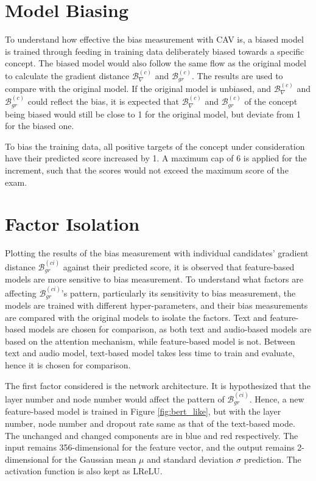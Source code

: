 \section{Model Biasing}
To understand how effective the bias measurement with CAV is, a biased model is trained through feeding in training data deliberately biased towards a specific concept. The biased model would also follow the same flow as the original model to calculate the gradient distance $\mathcal{B}^{(c)}_{\nabla}$ and $\mathcal{B}^{(c)}_{gr}$. The results are used to compare with the original model. If the original model is unbiased, and $\mathcal{B}^{(c)}_{\nabla}$ and $\mathcal{B}^{(c)}_{gr}$ could reflect the bias, it is expected that $\mathcal{B}^{(c)}_{\nabla}$ and $\mathcal{B}^{(c)}_{gr}$ of the concept being biased would still be close to 1 for the original model, but deviate from 1 for the biased one.

To bias the training data, all positive targets of the concept under consideration have their predicted score increased by 1. A maximum cap of 6 is applied for the increment, such that the scores would not exceed the maximum score of the exam.

\section{Factor Isolation}
Plotting the results of the bias measurement with individual candidates' gradient distance $\mathcal{B}^{(ci)}_{gr}$ against their predicted score, it is observed that feature-based models are more sensitive to bias measurement. To understand what factors are affecting $\mathcal{B}^{(ci)}_{gr}$'s pattern, particularly its sensitivity to bias measurement, the models are trained with different hyper-parameters, and their bias measurements are compared with the original models to isolate the factors. Text and feature-based models are chosen for comparison, as both text and audio-based models are based on the attention mechanism, while feature-based model is not. Between text and audio model, text-based model takes less time to train and evaluate, hence it is chosen for comparison.

The first factor considered is the network architecture. It is hypothesized that the layer number and node number would affect the pattern of $\mathcal{B}^{(ci)}_{gr}$. Hence, a new feature-based model is trained in Figure \ref{fig:bert_like}, but with the layer number, node number and dropout rate same as that of the text-based mode. The unchanged and changed components are in blue and red respectively. The input remains 356-dimensional for the feature vector, and the output remains 2-dimensional for the Gaussian mean $\mu$ and standard deviation $\sigma$ prediction. The activation function is also kept as LReLU.

